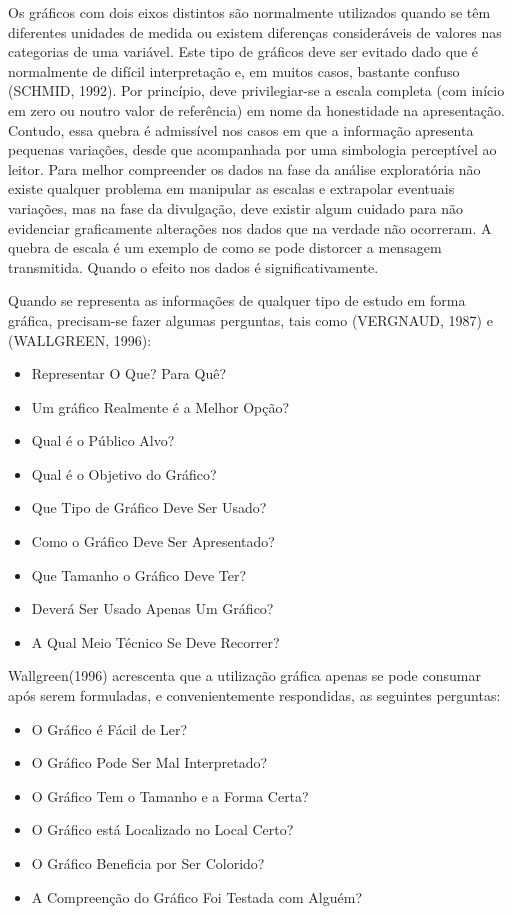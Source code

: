 \begin{itemize}

\inic Os gráficos com dois eixos distintos são normalmente utilizados quando se têm diferentes unidades de medida ou existem diferenças consideráveis de valores nas categorias de uma variável. Este tipo de gráficos deve ser evitado dado que é normalmente de difícil interpretação e, em muitos casos, bastante confuso (SCHMID, 1992). Por princípio, deve privilegiar-se a escala completa (com início em zero ou noutro valor de referência) em nome da honestidade na apresentação. Contudo, essa quebra é admissível nos casos em que a informação apresenta pequenas variações, desde que acompanhada por uma simbologia perceptível ao leitor. Para melhor compreender os dados na fase da análise exploratória não existe qualquer problema em manipular as escalas e extrapolar eventuais variações, mas na fase da divulgação, deve existir algum cuidado para não evidenciar graficamente alterações nos dados que na verdade não ocorreram. A quebra de escala é um exemplo de como se pode distorcer a mensagem transmitida. Quando o efeito nos dados é significativamente. 
\end{itemize}


Quando se representa as informações de qualquer tipo de estudo em forma gráfica, precisam-se fazer algumas perguntas, tais como (VERGNAUD, 1987) e (WALLGREEN, 1996):

\begin{itemize}
\item Representar O Que? Para Quê?
\item Um gráfico Realmente é a Melhor Opção?
\item Qual é o Público Alvo?
\item Qual é o Objetivo do Gráfico?
\item Que Tipo de Gráfico Deve Ser Usado?
\item Como o Gráfico Deve Ser Apresentado?
\item Que Tamanho o Gráfico Deve Ter?
\item Deverá Ser Usado Apenas Um Gráfico?
\item A Qual Meio Técnico Se Deve Recorrer?
\end{itemize}


\newpage
Wallgreen(1996) acrescenta que a utilização gráfica apenas se pode
consumar após serem formuladas, e convenientemente respondidas, as
seguintes perguntas:

\begin{itemize}
\item O Gráfico é Fácil de Ler? 
\item O Gráfico Pode Ser Mal Interpretado? 
\item O Gráfico Tem o Tamanho e a Forma Certa? 
\item O Gráfico está Localizado no Local Certo? 
\item O Gráfico Beneficia por Ser Colorido? 
\item A Compreenção do Gráfico Foi Testada com Alguém?
\end{itemize}



